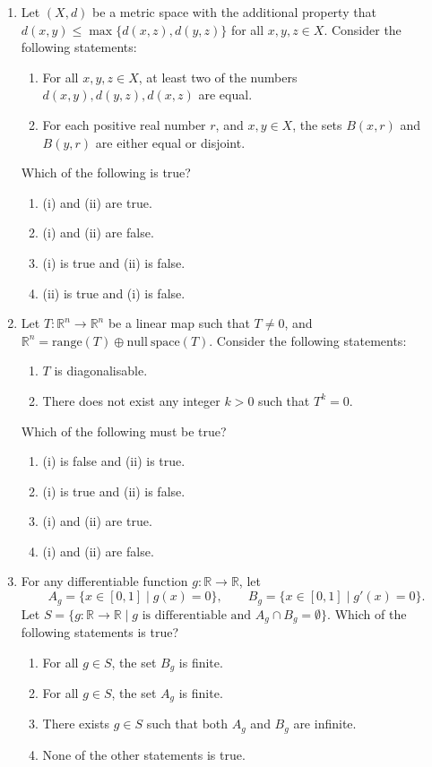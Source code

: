 \documentclass[11pt, a4paper]{article}
\begin{document}
\begin{enumerate}
\item Let $(X,d)$ be a metric space with the additional property that $d(x,y)\le\max\{d(x,z),d(y,z)\}$ for all $x,y,z\in X$. Consider the following statements:
\begin{enumerate}[label=(\roman*)]
\item For all $x,y,z\in X$, at least two of the numbers $d(x,y),d(y,z),d(x,z)$ are equal.
\item For each positive real number $r$, and $x,y\in X$, the sets $B(x,r)$ and $B(y,r)$ are either equal or disjoint.
\end{enumerate}
Which of the following is true?
\begin{enumerate}[label=(\alph*)]
\item (i) and (ii) are true.
\item (i) and (ii) are false.
\item (i) is true and (ii) is false.
\item (ii) is true and (i) is false.
\end{enumerate}

\item Let $T:\mathbb{R}^n\to\mathbb{R}^n$ be a linear map such that $T\neq0$, and $\mathbb{R}^n=\mathrm{range}(T)\oplus\mathrm{null\ space}(T)$. Consider the following statements:
\begin{enumerate}[label=(\roman*)]
\item $T$ is diagonalisable.
\item There does not exist any integer $k>0$ such that $T^k=0$.
\end{enumerate}
Which of the following must be true?
\begin{enumerate}[label=(\alph*)]
\item (i) is false and (ii) is true.
\item (i) is true and (ii) is false.
\item (i) and (ii) are true.
\item (i) and (ii) are false.
\end{enumerate}

\item For any differentiable function $g:\mathbb{R}\to\mathbb{R}$, let
\[ A_g=\{x\in[0,1]\mid g(x)=0\},\qquad B_g=\{x\in[0,1]\mid g'(x)=0\}. \]
Let $S=\{g:\mathbb{R}\to\mathbb{R}\mid g\text{ is differentiable and }A_g\cap B_g=\emptyset\}$. Which of the following statements is true?
\begin{enumerate}[label=(\alph*)]
\item For all $g\in S$, the set $B_g$ is finite.
\item For all $g\in S$, the set $A_g$ is finite.
\item There exists $g\in S$ such that both $A_g$ and $B_g$ are infinite.
\item None of the other statements is true.
\end{enumerate}


\end{enumerate}
\end{document}

